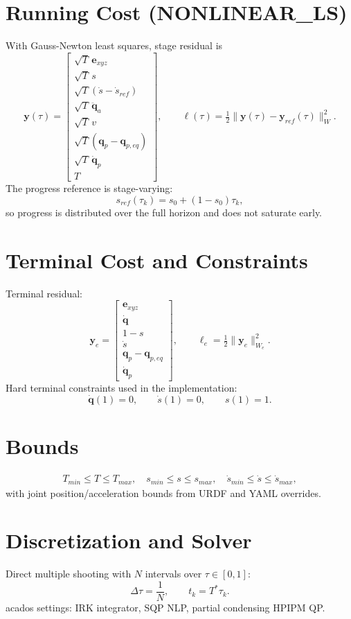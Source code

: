 \documentclass[11pt,a4paper]{article}
\newcommand{\q}{\bm{q}}
\newcommand{\dq}{\dot{\bm{q}}}
\newcommand{\ddq}{\ddot{\bm{q}}}
\begin{document}
\section*{Running Cost (NONLINEAR\_LS)}
With Gauss-Newton least squares, stage residual is
\begin{equation}
\bm{y}(\tau)=\begin{bmatrix}
\sqrt{T}\,\bm{e}_{xyz} \\
\sqrt{T}\,s \\
\sqrt{T}(\dot s-\dot s_{ref}) \\
\sqrt{T}\,\ddq_a \\
\sqrt{T}\,v \\
\sqrt{T}(\q_p-\q_{p,eq}) \\
\sqrt{T}\,\dq_p \\
T
\end{bmatrix},
\qquad
\ell(\tau)=\tfrac12\|\bm{y}(\tau)-\bm{y}_{ref}(\tau)\|_{W}^2.
\end{equation}
The progress reference is stage-varying:
\begin{equation}
 s_{ref}(\tau_k)=s_0+(1-s_0)\tau_k,
\end{equation}
so progress is distributed over the full horizon and does not saturate early.

\section*{Terminal Cost and Constraints}
Terminal residual:
\begin{equation}
\bm{y}_e=\begin{bmatrix}
\bm{e}_{xyz} \\
\dq \\
1-s \\
\dot s \\
\q_p-\q_{p,eq} \\
\dq_p
\end{bmatrix},
\qquad
\ell_e=\tfrac12\|\bm{y}_e\|_{W_e}^2.
\end{equation}
Hard terminal constraints used in the implementation:
\begin{equation}
\dq(1)=0,\qquad \dot s(1)=0,\qquad s(1)=1.
\end{equation}

\section*{Bounds}
\begin{align}
T_{min} \le T \le T_{max},\quad
s_{min}\le s\le s_{max},\quad
\dot s_{min}\le\dot s\le\dot s_{max},
\end{align}
with joint position/acceleration bounds from URDF and YAML overrides.

\section*{Discretization and Solver}
Direct multiple shooting with $N$ intervals over $\tau\in[0,1]$:
\begin{equation}
\Delta\tau=\frac{1}{N},\qquad t_k=T^*\tau_k.
\end{equation}
acados settings: IRK integrator, SQP NLP, partial condensing HPIPM QP.
\end{document}
